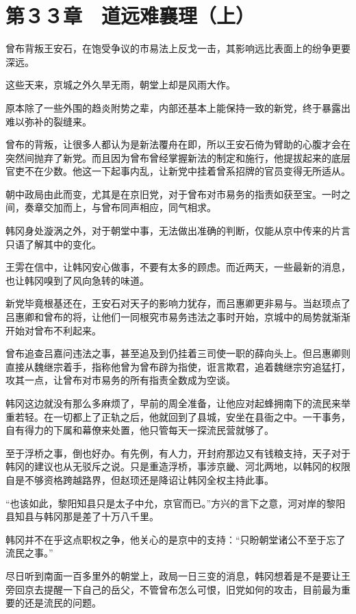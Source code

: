 \section{第３３章　道远难襄理（上）}

曾布背叛王安石，在饱受争议的市易法上反戈一击，其影响远比表面上的纷争更要深远。

这些天来，京城之外久旱无雨，朝堂上却是风雨大作。

原本除了一些外围的趋炎附势之辈，内部还基本上能保持一致的新党，终于暴露出难以弥补的裂缝来。

曾布的背叛，让很多人都认为是新法覆舟在即，所以王安石倚为臂助的心腹才会在突然间抛弃了新党。而且因为曾布曾经掌握新法的制定和施行，他提拔起来的底层官吏不在少数。他这一下起事内乱，让新党中挂着曾系招牌的官员变得无所适从。

朝中政局由此而变，尤其是在京旧党，对于曾布对市易务的指责如获至宝。一时之间，奏章交加而上，与曾布同声相应，同气相求。

韩冈身处漩涡之外，对于朝堂中事，无法做出准确的判断，仅能从京中传来的片言只语了解其中的变化。

王雱在信中，让韩冈安心做事，不要有太多的顾虑。而近两天，一些最新的消息，也让韩冈嗅到了风向急转的味道。

新党毕竟根基还在，王安石对天子的影响力犹存，而吕惠卿更非易与。当赵顼点了吕惠卿和曾布的将，让他们一同根究市易务违法之事时开始，京城中的局势就渐渐开始对曾布不利起来。

曾布追查吕嘉问违法之事，甚至追及到仍挂着三司使一职的薛向头上。但吕惠卿则直接从魏继宗着手，指称他曾为曾布辟为指使，诳言欺君，追着魏继宗穷追猛打，攻其一点，让曾布对市易务的所有指责全数成为空谈。

韩冈这边就没有那么多麻烦了，早前的周全准备，让他应对起蜂拥南下的流民来举重若轻。在一切都上了正轨之后，他就回到了县城，安坐在县衙之中。一干事务，自有得力的下属和幕僚来处置，他只管每天一探流民营就够了。

至于浮桥之事，倒也好办。有先例，有人力，开封府那边又有钱粮支持，天子对于韩冈的建议也从无驳斥之说。只是重造浮桥，事涉京畿、河北两地，以韩冈的权限自是不够资格跨越路界，但赵顼还是降诏让韩冈全权主持此事。

“也该如此，黎阳知县只是太子中允，京官而已。”方兴的言下之意，河对岸的黎阳县知县与韩冈那是差了十万八千里。

韩冈并不在乎这点职权之争，他关心的是京中的支持：“只盼朝堂诸公不至于忘了流民之事。”

尽日听到南面一百多里外的朝堂上，政局一日三变的消息，韩冈想着是不是要让王旁回京去提醒一下自己的岳父，不管曾布怎么可恨，旧党如何的攻击，目前最为重要的还是流民的问题。

